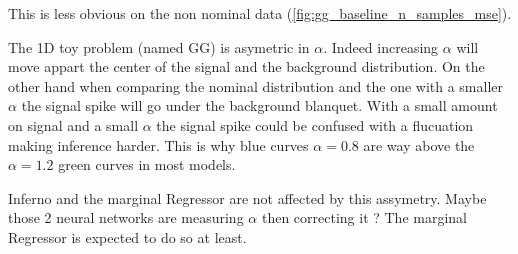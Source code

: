This is less obvious on the non nominal data (\autoref{fig:gg_baseline_n_samples_mse}).

The 1D toy problem (named GG) is asymetric in $\alpha$.
Indeed increasing $\alpha$ will move appart the center of the signal and the background distribution.
On the other hand when comparing the nominal distribution and the one with a smaller $\alpha$ the signal spike will go under the background blanquet.
With a small amount on signal and a small $\alpha$ the signal spike could be confused with a flucuation making inference harder.
This is why blue curves $\alpha=0.8$ are way above the $\alpha=1.2$ green curves in most models.

Inferno and the marginal Regressor are not affected by this assymetry.
Maybe those 2 neural networks are measuring $\alpha$ then correcting it ?
The marginal Regressor is expected to do so at least.


